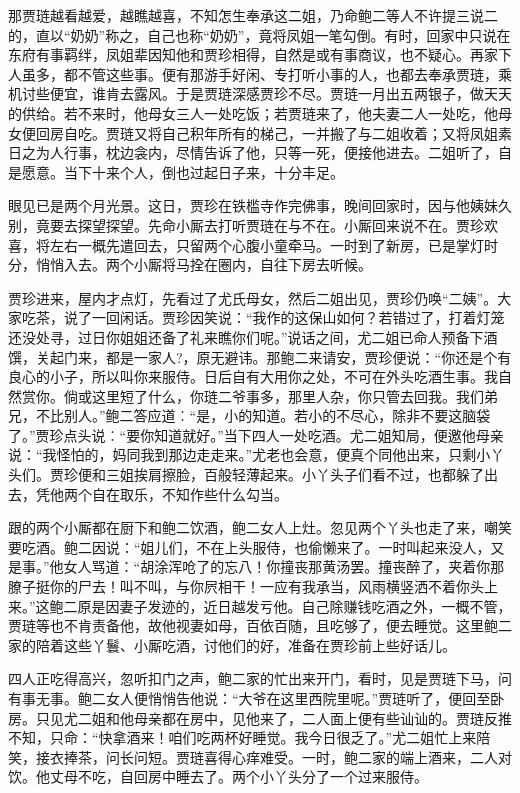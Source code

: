 \documentclass[12pt,oneside]{book}
\begin{document}
那贾琏越看越爱，越瞧越喜，不知怎生奉承这二姐，乃命鲍二等人不许提三说二的，直以“奶奶”称之，自己也称“奶奶”，竟将凤姐一笔勾倒。有时，回家中只说在东府有事羁绊，凤姐辈因知他和贾珍相得，自然是或有事商议，也不疑心。再家下人虽多，都不管这些事。便有那游手好闲、专打听小事的人，也都去奉承贾琏，乘机讨些便宜，谁肯去露风。于是贾琏深感贾珍不尽。贾琏一月出五两银子，做天天的供给。若不来时，他母女三人一处吃饭；若贾琏来了，他夫妻二人一处吃，他母女便回房自吃。贾琏又将自己积年所有的梯己，一并搬了与二姐收着；又将凤姐素日之为人行事，枕边衾内，尽情告诉了他，只等一死，便接他进去。二姐听了，自是愿意。当下十来个人，倒也过起日子来，十分丰足。

眼见已是两个月光景。这日，贾珍在铁槛寺作完佛事，晚间回家时，因与他姨妹久别，竟要去探望探望。先命小厮去打听贾琏在与不在。小厮回来说不在。贾珍欢喜，将左右一概先遣回去，只留两个心腹小童牵马。一时到了新房，已是掌灯时分，悄悄入去。两个小厮将马拴在圈内，自往下房去听候。

贾珍进来，屋内才点灯，先看过了尤氏母女，然后二姐出见，贾珍仍唤“二姨”。大家吃茶，说了一回闲话。贾珍因笑说：“我作的这保山如何？若错过了，打着灯笼还没处寻，过日你姐姐还备了礼来瞧你们呢。”说话之间，尤二姐已命人预备下酒馔，关起门来，都是一家人?，原无避讳。那鲍二来请安，贾珍便说：“你还是个有良心的小子，所以叫你来服侍。日后自有大用你之处，不可在外头吃酒生事。我自然赏你。倘或这里短了什么，你琏二爷事多，那里人杂，你只管去回我。我们弟兄，不比别人。”鲍二答应道︰“是，小的知道。若小的不尽心，除非不要这脑袋了。”贾珍点头说︰“要你知道就好。”当下四人一处吃酒。尤二姐知局，便邀他母亲说：“我怪怕的，妈同我到那边走走来。”尤老也会意，便真个同他出来，只剩小丫头们。贾珍便和三姐挨肩擦脸，百般轻薄起来。小丫头子们看不过，也都躲了出去，凭他两个自在取乐，不知作些什么勾当。

跟的两个小厮都在厨下和鲍二饮酒，鲍二女人上灶。忽见两个丫头也走了来，嘲笑要吃酒。鲍二因说：“姐儿们，不在上头服侍，也偷懒来了。一时叫起来没人，又是事。”他女人骂道：“胡涂浑呛了的忘八！你撞丧那黄汤罢。撞丧醉了，夹着你那膫子挺你的尸去！叫不叫，与你屄相干！一应有我承当，风雨横竖洒不着你头上来。”这鲍二原是因妻子发迹的，近日越发亏他。自己除赚钱吃酒之外，一概不管，贾琏等也不肯责备他，故他视妻如母，百依百随，且吃够了，便去睡觉。这里鲍二家的陪着这些丫鬟、小厮吃酒，讨他们的好，准备在贾珍前上些好话儿。

四人正吃得高兴，忽听扣门之声，鲍二家的忙出来开门，看时，见是贾琏下马，问有事无事。鲍二女人便悄悄告他说：“大爷在这里西院里呢。”贾琏听了，便回至卧房。只见尤二姐和他母亲都在房中，见他来了，二人面上便有些讪讪的。贾琏反推不知，只命：“快拿酒来！咱们吃两杯好睡觉。我今日很乏了。”尤二姐忙上来陪笑，接衣捧茶，问长问短。贾琏喜得心痒难受。一时，鲍二家的端上酒来，二人对饮。他丈母不吃，自回房中睡去了。两个小丫头分了一个过来服侍。
\end{document}
